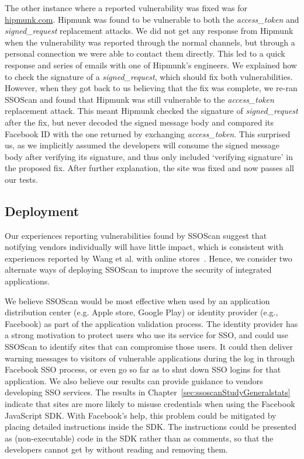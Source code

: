 The other instance where a reported vulnerability was fixed was for \url{hipmunk.com}.  Hipmunk was found to be vulnerable to both the \emph{access\_token} and \emph{signed\_request} replacement attacks.  We did not get any response from Hipmunk when the vulnerability was reported through the normal channels, but through a personal connection we were able to contact them directly.  This led to a quick response and series of emails with one of Hipmunk's engineers.  We explained how to check the signature of a \emph{signed\_request}, which should fix both vulnerabilities.  However, when they got back to us believing that the fix was complete, we re-ran SSOScan and found that Hipmunk was still vulnerable to the \emph{access\_token} replacement attack.  This meant Hipmunk checked the signature of \emph{signed\_request} after the fix, but never decoded the signed message body and compared its Facebook ID with the one returned by exchanging \emph{access\_token}.  This surprised us, as we implicitly assumed the developers will consume the signed message body after verifying its signature, and thus only included `verifying signature' in the proposed fix.  After further explanation, the site was fixed and now passes all our tests.

\subsection{Deployment}\label{sec:deployment}
Our experiences reporting vulnerabilities found by SSOScan suggest that notifying vendors individually will have little impact, which is consistent with experiences reported by Wang et al. with online stores~\cite{Wang:2011:SFO:2006077.2006782}.  Hence, we consider two alternate ways of deploying SSOScan to improve the security of integrated applications.

 We believe SSOScan would be most effective when used by an application distribution center (e.g. Apple store, Google Play) or identity provider (e.g., Facebook) as part of the application validation process.  The identity provider has a strong motivation to protect users who use its service for SSO, and could use SSOScan to identify sites that can compromise those users.  It could then deliver warning messages to visitors of vulnerable applications during the log in through Facebook SSO process, or even go so far as to shut down SSO logins for that application.  We also believe our results can provide guidance to vendors developing SSO services.  The results in Chapter~\ref{sec:ssoscanStudyGeneralstats} indicate that sites are more likely to misuse credentials when using the Facebook JavaScript SDK.  With Facebook's help, this problem could be mitigated by placing detailed instructions inside the SDK.  The instructions could be presented as (non-executable) code in the SDK rather than as comments, so that the developers cannot get by without reading and removing them.

